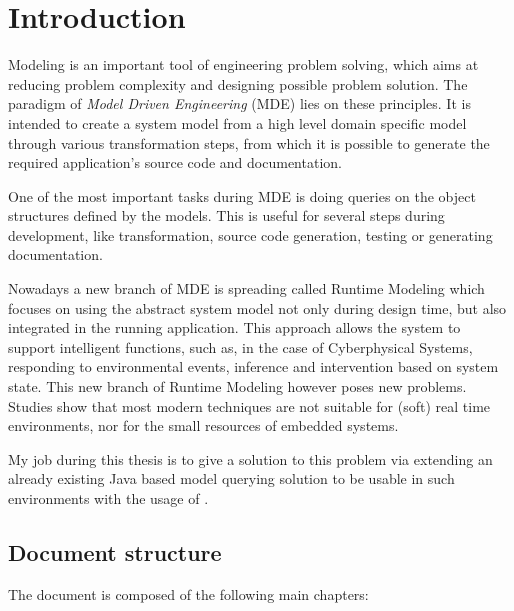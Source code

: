\chapter*{Introduction}

Modeling is an important tool of engineering problem solving, which aims at
reducing problem complexity and designing possible problem solution. The
paradigm of \emph{Model Driven Engineering} (MDE) lies on these principles. It
is intended to create a system model from a high level domain specific model
through various transformation steps, from which it is possible to generate the
required application's source code and documentation.

One of the most important tasks during MDE is doing queries on the object
structures defined by the models. This is useful for several steps during
development, like transformation, source code generation, testing or generating
documentation.

Nowadays a new branch of MDE is spreading called Runtime Modeling which focuses
on using the abstract system model not only during design time, but also
integrated in the running application. This approach allows the system to
support intelligent functions, such as, in the case of Cyberphysical Systems,
responding to environmental events, inference and intervention based on system
state. This new branch of Runtime Modeling however poses new problems. Studies show
that most modern techniques are not suitable for (soft) real time environments,
nor for the small resources of embedded systems.

My job during this thesis is to give a solution to this problem via
extending an already existing Java based model querying solution to be usable in
such environments with the usage of \CPP{}.

\section*{Document structure}\label{sec:DocumentStructure}

The document is composed of the following main chapters:

